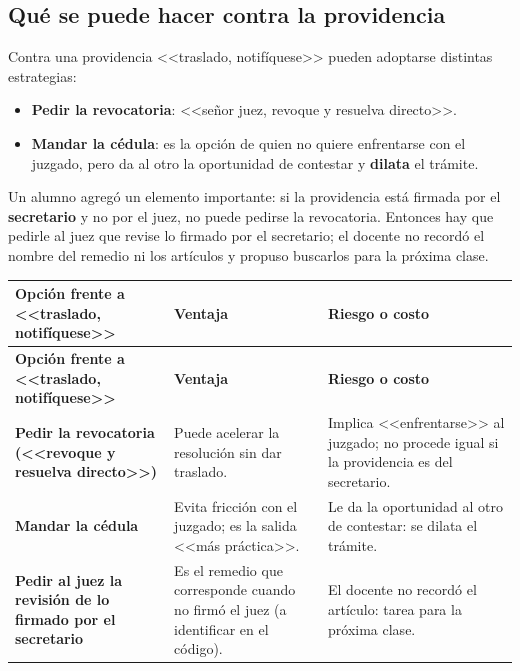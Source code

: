 \documentclass[12pt,oneside]{book}
\begin{document}
\subsection{Qué se puede hacer contra la providencia}

Contra una providencia <<traslado, notifíquese>> pueden adoptarse distintas estrategias:

\begin{itemize}
    \item \textbf{Pedir la revocatoria}: <<señor juez, revoque y resuelva directo>>.
    \item \textbf{Mandar la cédula}: es la opción de quien no quiere enfrentarse con el juzgado, pero da al otro la oportunidad de contestar y \textbf{dilata} el trámite.
\end{itemize}

Un alumno agregó un elemento importante: si la providencia está firmada por el \textbf{secretario} y no por el juez, no puede pedirse la revocatoria. Entonces hay que pedirle al juez que revise lo firmado por el secretario; el docente no recordó el nombre del remedio ni los artículos y propuso buscarlos para la próxima clase.


\begin{longtable}{@{}L{0.30\textwidth}L{0.29\textwidth}L{0.31\textwidth}@{}}
\toprule
\textbf{Opción frente a <<traslado, notifíquese>>} & \textbf{Ventaja} & \textbf{Riesgo o costo} \\
\midrule
\endfirsthead
\toprule
\textbf{Opción frente a <<traslado, notifíquese>>} & \textbf{Ventaja} & \textbf{Riesgo o costo} \\
\midrule
\endhead
\bottomrule
\endlastfoot
\textbf{Pedir la revocatoria (<<revoque y resuelva directo>>)} & Puede acelerar la resolución sin dar traslado. & Implica <<enfrentarse>> al juzgado; no procede igual si la providencia es del secretario. \\
\textbf{Mandar la cédula} & Evita fricción con el juzgado; es la salida <<más práctica>>. & Le da la oportunidad al otro de contestar: se dilata el trámite. \\
\textbf{Pedir al juez la revisión de lo firmado por el secretario} & Es el remedio que corresponde cuando no firmó el juez (a identificar en el código). & El docente no recordó el artículo: tarea para la próxima clase. \\
\end{longtable}
\end{document}
